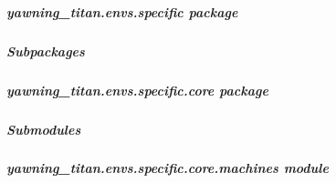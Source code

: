 \documentclass[letterpaper,10pt,english]{sphinxmanual}
\begin{document}
\subparagraph{yawning\_titan.envs.specific package}
\label{\detokenize{source/yawning_titan.envs.specific:yawning-titan-envs-specific-package}}\label{\detokenize{source/yawning_titan.envs.specific::doc}}

\subparagraph{Subpackages}
\label{\detokenize{source/yawning_titan.envs.specific:subpackages}}

\subparagraph{yawning\_titan.envs.specific.core package}
\label{\detokenize{source/yawning_titan.envs.specific.core:yawning-titan-envs-specific-core-package}}\label{\detokenize{source/yawning_titan.envs.specific.core::doc}}

\subparagraph{Submodules}
\label{\detokenize{source/yawning_titan.envs.specific.core:submodules}}

\subparagraph{yawning\_titan.envs.specific.core.machines module}
\label{\detokenize{source/yawning_titan.envs.specific.core:module-yawning_titan.envs.specific.core.machines}}\label{\detokenize{source/yawning_titan.envs.specific.core:yawning-titan-envs-specific-core-machines-module}}
\end{document}
